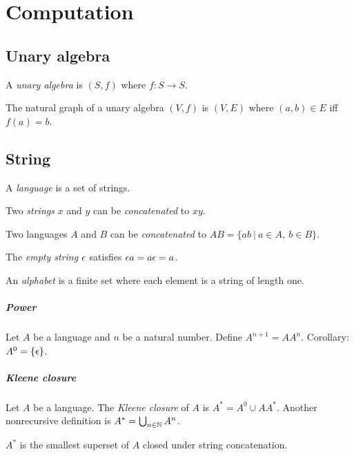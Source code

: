 \chapter{Computation}

\section{Unary algebra}

%
A \emph{unary algebra} is \((S,f)\) where \(f : S \to S\).

The natural graph of a unary algebra \((V,f)\) is \((V,E)\)
where \((a,b) \in E\) iff \(f(a) = b\).

\section{String}

%
A \emph{language} is a set of strings.

Two
%
\emph{strings}
\(x\) and \(y\) can be
%
%
\emph{concatenated} to \(xy\).

Two languages \(A\) and \(B\) can be
%
%
\emph{concatenated} to
\(AB = \{ ab ~|~ a \in A, ~ b \in B \}\).

The
%
%
\emph{empty string} \(\epsilon\) satisfies \(\epsilon a = a \epsilon = a\).

%
An \emph{alphabet} is a finite set where each element is a string of length one.

\paragraph{Power}
Let \(A\) be a language and \(n\) be a natural number.
Define \(A^{n+1} = A A^n\).
Corollary: \(A^0 = \{\epsilon\}\).

\paragraph{Kleene closure}
Let \(A\) be a language.
The
%
%
%
\emph{Kleene closure}
of \(A\) is \(A^* = A^0 \cup AA^*\).
Another nonrecursive definition is
\( A^* = \bigcup_{n \in \mathbb{N}} A^n \).

\(A^*\) is the smallest superset of \(A\)
closed under string concatenation.

